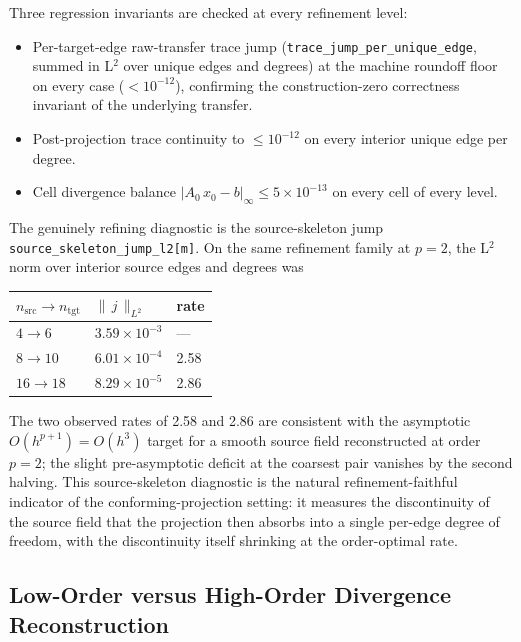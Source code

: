 \documentclass[11pt]{article}
\begin{document}
Three regression invariants are checked at every refinement level:
\begin{itemize}
  \item Per-target-edge raw-transfer trace jump
        (\texttt{trace\_jump\_per\_unique\_edge}, summed in L\(^2\) over
        unique edges and degrees) at the machine roundoff floor on every
        case (\(<10^{-12}\)), confirming the construction-zero correctness
        invariant of the underlying transfer.
  \item Post-projection trace continuity to \(\le10^{-12}\) on every
        interior unique edge per degree.
  \item Cell divergence balance \(|A_0\,x_0 - b|_\infty\le5\times10^{-13}\)
        on every cell of every level.
\end{itemize}

The genuinely refining diagnostic is the source-skeleton jump
\texttt{source\_skeleton\_jump\_l2[m]}.  On the same refinement family at
\(p=2\), the L\(^2\) norm over interior source edges and degrees was

\begin{center}
\begin{tabular}{lll}
\toprule
\(n_{\mathrm{src}} \to n_{\mathrm{tgt}}\) & \(\|\,j\,\|_{L^2}\) & rate \\
\midrule
\(4\to6\)   & \(3.59\times10^{-3}\) & --- \\
\(8\to10\)  & \(6.01\times10^{-4}\) & 2.58 \\
\(16\to18\) & \(8.29\times10^{-5}\) & 2.86 \\
\bottomrule
\end{tabular}
\end{center}

The two observed rates of 2.58 and 2.86 are consistent with the asymptotic
\(O(h^{p+1})=O(h^3)\) target for a smooth source field reconstructed at order
\(p=2\); the slight pre-asymptotic deficit at the coarsest pair vanishes by
the second halving.  This source-skeleton diagnostic is the natural
refinement-faithful indicator of the conforming-projection setting: it
measures the discontinuity of the source field that the projection then
absorbs into a single per-edge degree of freedom, with the discontinuity
itself shrinking at the order-optimal rate.

\subsection{Low-Order versus High-Order Divergence Reconstruction}
\end{document}
